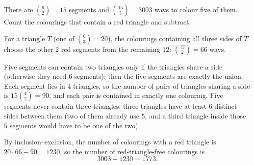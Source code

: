 There are $\binom62=15$ segments and $\binom{15}5=3003$ ways to colour five of them. Count the colourings that contain a red triangle and subtract.

For a triangle $T$ (one of $\binom63=20$), the colourings containing all three sides of $T$ choose the other $2$ red segments from the remaining $12$: $\binom{12}2=66$ ways.

Five segments can contain two triangles only if the triangles share a side (otherwise they need $6$ segments); then the five segments are exactly the union. Each segment lies in $4$ triangles, so the number of pairs of triangles sharing a side is $15\binom42=90$, and each pair is contained in exactly one colouring. Five segments never contain three triangles: three triangles have at least $6$ distinct sides between them (two of them already use $5$, and a third triangle inside those $5$ segments would have to be one of the two).

By inclusion--exclusion, the number of colourings with a red triangle is $20\cdot66-90=1230$, so the number of red-triangle-free colourings is
\[
3003-1230=\boxed{1773}.
\]
